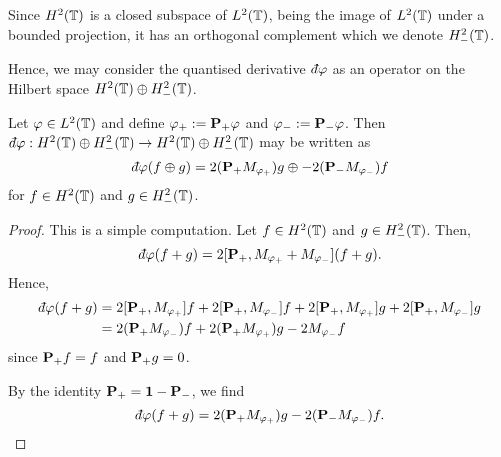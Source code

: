 Since $H^2(\mathbb{T})$
is a closed subspace of $L^2(\mathbb{T})$, being the image of $L^2(\mathbb{T})$
under a bounded projection, it has an orthogonal complement which we denote $H^2_-(\mathbb{T})$.

Hence, we may consider the quantised derivative $\qd\varphi$ as an operator on
the Hilbert space $H^2(\mathbb{T})\oplus H^2_-(\mathbb{T})$.

\begin{lemma}
\label{hankelDecomposition}
    Let $\varphi \in L^2(\mathbb{T})$ and define $\varphi_+ := \mathbf{P}_+ \varphi$ and $\varphi_- := \mathbf{P}_- \varphi$. Then $\qd\varphi:H^2(\Circ)\oplus H^2_-(\Circ)\rightarrow H^2(\Circ)\oplus H^2_-(\Circ)$ may be written as
    \begin{equation}
        \qd\varphi(f\oplus g) = 
            2(\Proj_+M_{\varphi_+})g \oplus
            -2(\Proj_-M_{\varphi_-})f
    \end{equation}
    for $f \in H^2(\mathbb{T})$ and $g \in H^2_-(\mathbb{T})$.
\end{lemma}
\begin{proof}
    This is a simple computation. Let $f \in H^2(\mathbb{T})$ and $g \in H^2_-(\mathbb{T})$. Then,
    \begin{equation}
        \qd\varphi(f+g) = 2[\Proj_+,M_{\varphi_+}+M_{\varphi_-}](f+g).
    \end{equation}
    Hence,
    \begin{align*}
        \qd\varphi(f+g) &= 2[\Proj_+,M_{\varphi_+}]f + 2[\Proj_+,M_{\varphi_-}]f + 2[\Proj_+,M_{\varphi_+}]g + 2[\Proj_+,M_{\varphi_-}]g\\
        &= 2(\Proj_+M_{\varphi_-})f+2(\Proj_+M_{\varphi_+})g-2M_{\varphi_-}f
    \end{align*}
    since $\mathbf{P}_+f = f$ and $\mathbf{P}_+g = 0$.
    
    By the identity $\mathbf{P}_+ = \mathbf{1}-\mathbf{P}_-$, we find
    \begin{equation}
        \qd\varphi(f+g) = 2(\Proj_+M_{\varphi_+})g - 2(\Proj_-M_{\varphi_-})f.
    \end{equation}
\end{proof}


